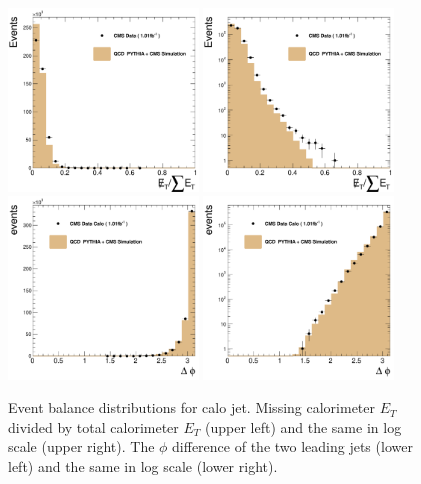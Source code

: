 \begin{figure}[!ht]
  \begin{center}
   \includegraphics[width=0.45\textwidth]{Figures/c_MET_over_sumEt.pdf}
   \includegraphics[width=0.45\textwidth]{Figures/c_MET_over_sumEt_log.pdf}
   \includegraphics[width=0.45\textwidth]{Figures/c_DPhi.pdf}
   \includegraphics[width=0.45\textwidth]{Figures/c_DPhi_log.pdf}

   \caption{ Event balance distributions for calo jet.  Missing
    calorimeter $E_T$ divided by total calorimeter $E_T$ 
    (upper left) and the same in log scale (upper right).
    The $\phi$ difference of the two leading jets (lower left) 
    and the same in log scale (lower right).}
    \label{basic_event_calo}
  \end{center}
\end{figure}

